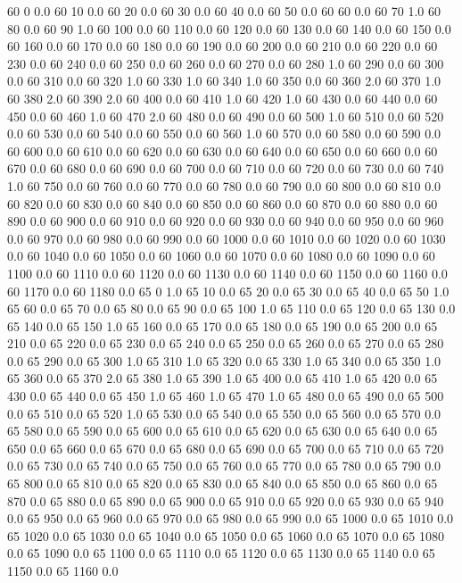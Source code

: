 60	0	0.0
60	10	0.0
60	20	0.0
60	30	0.0
60	40	0.0
60	50	0.0
60	60	0.0
60	70	1.0
60	80	0.0
60	90	1.0
60	100	0.0
60	110	0.0
60	120	0.0
60	130	0.0
60	140	0.0
60	150	0.0
60	160	0.0
60	170	0.0
60	180	0.0
60	190	0.0
60	200	0.0
60	210	0.0
60	220	0.0
60	230	0.0
60	240	0.0
60	250	0.0
60	260	0.0
60	270	0.0
60	280	1.0
60	290	0.0
60	300	0.0
60	310	0.0
60	320	1.0
60	330	1.0
60	340	1.0
60	350	0.0
60	360	2.0
60	370	1.0
60	380	2.0
60	390	2.0
60	400	0.0
60	410	1.0
60	420	1.0
60	430	0.0
60	440	0.0
60	450	0.0
60	460	1.0
60	470	2.0
60	480	0.0
60	490	0.0
60	500	1.0
60	510	0.0
60	520	0.0
60	530	0.0
60	540	0.0
60	550	0.0
60	560	1.0
60	570	0.0
60	580	0.0
60	590	0.0
60	600	0.0
60	610	0.0
60	620	0.0
60	630	0.0
60	640	0.0
60	650	0.0
60	660	0.0
60	670	0.0
60	680	0.0
60	690	0.0
60	700	0.0
60	710	0.0
60	720	0.0
60	730	0.0
60	740	1.0
60	750	0.0
60	760	0.0
60	770	0.0
60	780	0.0
60	790	0.0
60	800	0.0
60	810	0.0
60	820	0.0
60	830	0.0
60	840	0.0
60	850	0.0
60	860	0.0
60	870	0.0
60	880	0.0
60	890	0.0
60	900	0.0
60	910	0.0
60	920	0.0
60	930	0.0
60	940	0.0
60	950	0.0
60	960	0.0
60	970	0.0
60	980	0.0
60	990	0.0
60	1000	0.0
60	1010	0.0
60	1020	0.0
60	1030	0.0
60	1040	0.0
60	1050	0.0
60	1060	0.0
60	1070	0.0
60	1080	0.0
60	1090	0.0
60	1100	0.0
60	1110	0.0
60	1120	0.0
60	1130	0.0
60	1140	0.0
60	1150	0.0
60	1160	0.0
60	1170	0.0
60	1180	0.0
65	0	1.0
65	10	0.0
65	20	0.0
65	30	0.0
65	40	0.0
65	50	1.0
65	60	0.0
65	70	0.0
65	80	0.0
65	90	0.0
65	100	1.0
65	110	0.0
65	120	0.0
65	130	0.0
65	140	0.0
65	150	1.0
65	160	0.0
65	170	0.0
65	180	0.0
65	190	0.0
65	200	0.0
65	210	0.0
65	220	0.0
65	230	0.0
65	240	0.0
65	250	0.0
65	260	0.0
65	270	0.0
65	280	0.0
65	290	0.0
65	300	1.0
65	310	1.0
65	320	0.0
65	330	1.0
65	340	0.0
65	350	1.0
65	360	0.0
65	370	2.0
65	380	1.0
65	390	1.0
65	400	0.0
65	410	1.0
65	420	0.0
65	430	0.0
65	440	0.0
65	450	1.0
65	460	1.0
65	470	1.0
65	480	0.0
65	490	0.0
65	500	0.0
65	510	0.0
65	520	1.0
65	530	0.0
65	540	0.0
65	550	0.0
65	560	0.0
65	570	0.0
65	580	0.0
65	590	0.0
65	600	0.0
65	610	0.0
65	620	0.0
65	630	0.0
65	640	0.0
65	650	0.0
65	660	0.0
65	670	0.0
65	680	0.0
65	690	0.0
65	700	0.0
65	710	0.0
65	720	0.0
65	730	0.0
65	740	0.0
65	750	0.0
65	760	0.0
65	770	0.0
65	780	0.0
65	790	0.0
65	800	0.0
65	810	0.0
65	820	0.0
65	830	0.0
65	840	0.0
65	850	0.0
65	860	0.0
65	870	0.0
65	880	0.0
65	890	0.0
65	900	0.0
65	910	0.0
65	920	0.0
65	930	0.0
65	940	0.0
65	950	0.0
65	960	0.0
65	970	0.0
65	980	0.0
65	990	0.0
65	1000	0.0
65	1010	0.0
65	1020	0.0
65	1030	0.0
65	1040	0.0
65	1050	0.0
65	1060	0.0
65	1070	0.0
65	1080	0.0
65	1090	0.0
65	1100	0.0
65	1110	0.0
65	1120	0.0
65	1130	0.0
65	1140	0.0
65	1150	0.0
65	1160	0.0
